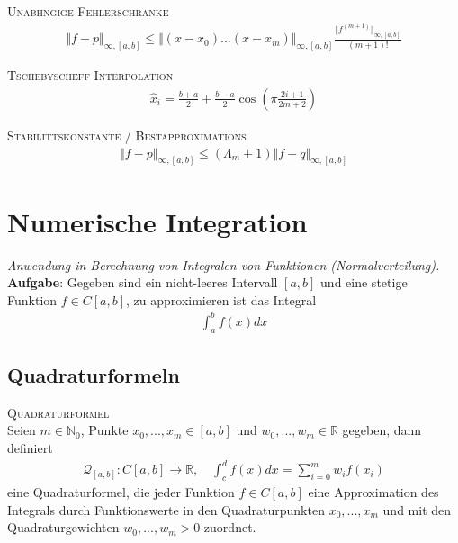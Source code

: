 \textsc{Unabh\a ngige Fehlerschranke}\\
\begin{align*}
\Vert f-p \Vert_{\infty,[a,b]} \leq \Vert (x - x_0 )...(x - x_m ) \Vert_{\infty,[a,b]} \frac{\Vert f^{(m+1)} \Vert_{\infty,[a,b]}}{(m+1)!}
\end{align*}

\textsc{Tschebyscheff-Interpolation}\\
\begin{align*}
\hat{x}_i = \frac{b+a}{2} + \frac{b-a}{2} \cos \left( \pi \frac{2i+1}{2m+2}\right)
\end{align*}

\textsc{Stabilit\a tskonstante / Bestapproximations}\\
\begin{align*}
\Vert f-p \Vert_{\infty,[a,b]} \leq (\Lambda_m + 1) \Vert f-q \Vert_{\infty,[a,b]} 
\end{align*}

\section{Numerische Integration}
\emph{Anwendung in Berechnung von Integralen von Funktionen (Normalverteilung).}\\

\textbf{Aufgabe}:
Gegeben sind ein nicht-leeres Intervall $[a,b]$ und eine stetige
Funktion $f \in C[a,b]$, zu approximieren ist das Integral
\begin{align*}
\int_a^b f(x) dx
\end{align*}

\subsection{Quadraturformeln}
\textsc{Quadraturformel}\\
Seien $m \in \mathbb{N}_0$, Punkte $x_0, ..., x_m \in [a,b]$ und $w_0, ..., w_m \in \mathbb{R}$ gegeben, dann definiert 
\begin{align*}
\mathcal{Q}_{[a,b]}: C[a,b] \rightarrow \mathbb{R}, \quad \int_c^d f(x) dx = \sum_{i=0}^m w_if(x_i)
\end{align*}
eine Quadraturformel, die jeder Funktion $f \in C[a,b]$ eine Approximation des Integrals durch Funktionswerte in den Quadraturpunkten $x_0 ,...,x_m$ und mit den Quadraturgewichten $w_0,...,w_m>0$ zuordnet.\vspace{0.2cm}

